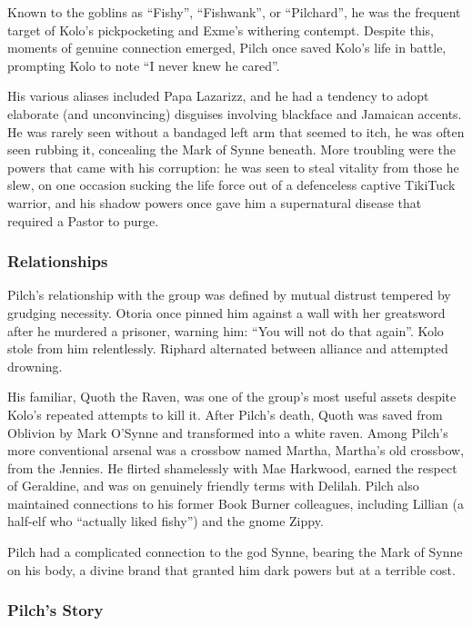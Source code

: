Known to the goblins as ``Fishy'', ``Fishwank'', or ``Pilchard'', he was the frequent target of Kolo's pickpocketing and Exme's withering contempt.  Despite this, moments of genuine connection emerged, Pilch once saved Kolo's life in battle, prompting Kolo to note ``I never knew he cared''.

His various aliases included Papa Lazarizz, and he had a tendency to adopt elaborate (and unconvincing) disguises involving blackface and Jamaican accents.  He was rarely seen without a bandaged left arm that seemed to itch, he was often seen rubbing it, concealing the Mark of Synne beneath.  More troubling were the powers that came with his corruption: he was seen to steal vitality from those he slew, on one occasion sucking the life force out of a defenceless captive TikiTuck warrior, and his shadow powers once gave him a supernatural disease that required a Pastor to purge.

\subsubsection{Relationships}

Pilch's relationship with the group was defined by mutual distrust tempered by grudging necessity.  Otoria once pinned him against a wall with her greatsword after he murdered a prisoner, warning him: ``You will not do that again''.  Kolo stole from him relentlessly.  Riphard alternated between alliance and attempted drowning.

His familiar, Quoth the Raven, was one of the group's most useful assets despite Kolo's repeated attempts to kill it.  After Pilch's death, Quoth was saved from Oblivion by Mark O'Synne and transformed into a white raven.  Among Pilch's more conventional arsenal was a crossbow named Martha, Martha's old crossbow, from the Jennies.  He flirted shamelessly with Mae Harkwood, earned the respect of Geraldine, and was on genuinely friendly terms with Delilah.  Pilch also maintained connections to his former Book Burner colleagues, including Lillian (a half-elf who ``actually liked fishy'') and the gnome Zippy.

Pilch had a complicated connection to the god Synne, bearing the Mark of Synne on his body, a divine brand that granted him dark powers but at a terrible cost.

\subsubsection{Pilch's Story}

